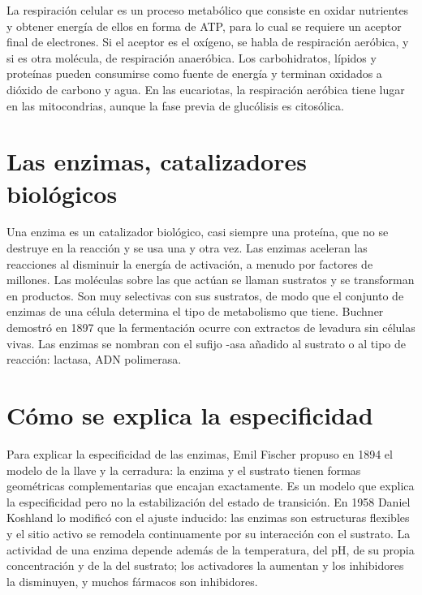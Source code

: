 \documentclass{book}
\begin{document}
La respiración celular es un proceso metabólico que consiste en oxidar nutrientes y obtener energía de ellos en forma de ATP, para lo cual se requiere un aceptor final de electrones. Si el aceptor es el oxígeno, se habla de respiración aeróbica, y si es otra molécula, de respiración anaeróbica. Los carbohidratos, lípidos y proteínas pueden consumirse como fuente de energía y terminan oxidados a dióxido de carbono y agua. En las eucariotas, la respiración aeróbica tiene lugar en las mitocondrias, aunque la fase previa de glucólisis es citosólica.


\section{Las enzimas, catalizadores biológicos}

Una enzima es un catalizador biológico, casi siempre una proteína, que no se destruye en la reacción y se usa una y otra vez. Las enzimas aceleran las reacciones al disminuir la energía de activación, a menudo por factores de millones. Las moléculas sobre las que actúan se llaman sustratos y se transforman en productos. Son muy selectivas con sus sustratos, de modo que el conjunto de enzimas de una célula determina el tipo de metabolismo que tiene. Buchner demostró en 1897 que la fermentación ocurre con extractos de levadura sin células vivas. Las enzimas se nombran con el sufijo -asa añadido al sustrato o al tipo de reacción: lactasa, ADN polimerasa.


\section{Cómo se explica la especificidad}

Para explicar la especificidad de las enzimas, Emil Fischer propuso en 1894 el modelo de la llave y la cerradura: la enzima y el sustrato tienen formas geométricas complementarias que encajan exactamente. Es un modelo que explica la especificidad pero no la estabilización del estado de transición. En 1958 Daniel Koshland lo modificó con el ajuste inducido: las enzimas son estructuras flexibles y el sitio activo se remodela continuamente por su interacción con el sustrato. La actividad de una enzima depende además de la temperatura, del pH, de su propia concentración y de la del sustrato; los activadores la aumentan y los inhibidores la disminuyen, y muchos fármacos son inhibidores.
\end{document}
